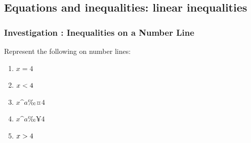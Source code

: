     
    
    
    
    
  
\label{m39254*cid6}
            \subsection{ Equations and inequalities: linear inequalities}
            \nopagebreak
            
      
\label{m39254*secfhsst!!!underscore!!!id3912}
            \subsubsection{  Investigation : Inequalities on a Number Line }
            \nopagebreak
            
      \label{m39254*id157128}Represent the following
on number lines:\par 
      \label{m39254*id157134}\begin{enumerate}[noitemsep, label=\textbf{\arabic*}. ] 
            \label{m39254*uid77}\item 
          \begin{math}x=4\end{math}
        \label{m39254*uid78}\item 
          \begin{math}x<{}4\end{math}
        \label{m39254*uid79}\item 
          \begin{math}x\^{a}‰¤4\end{math}
        \label{m39254*uid80}\item 
          \begin{math}x\^{a}‰¥4\end{math}
        \label{m39254*uid81}\item 
          \begin{math}x>{}4\end{math}
        \end{enumerate}
        
      

